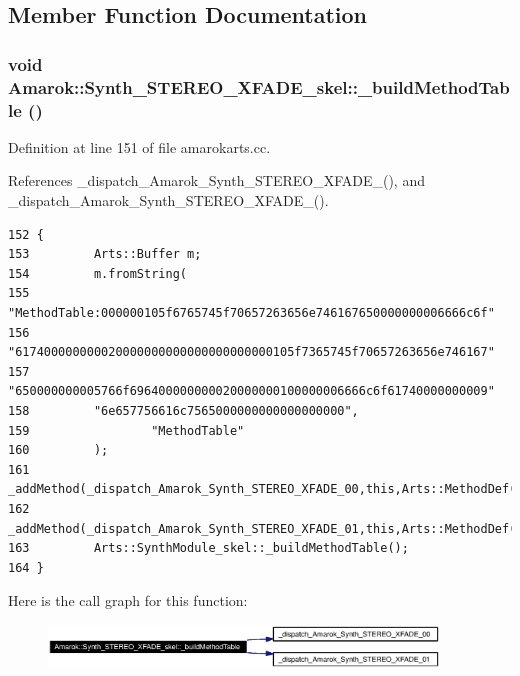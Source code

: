 \subsection{Member Function Documentation}
\subsubsection{\setlength{\rightskip}{0pt plus 5cm}void Amarok::Synth\_\-STEREO\_\-XFADE\_\-skel::\_\-build\-Method\-Table ()}\label{classAmarok_1_1Synth__STEREO__XFADE__skel_Amarok_1_1Synth__STEREO__XFADE__skela3}




Definition at line 151 of file amarokarts.cc.

References \_\-dispatch\_\-Amarok\_\-Synth\_\-STEREO\_\-XFADE\_(), and \_\-dispatch\_\-Amarok\_\-Synth\_\-STEREO\_\-XFADE\_().



\footnotesize\begin{verbatim}152 {
153         Arts::Buffer m;
154         m.fromString(
155         "MethodTable:000000105f6765745f70657263656e746167650000000006666c6f"
156         "617400000000020000000000000000000000105f7365745f70657263656e746167"
157         "650000000005766f696400000000020000000100000006666c6f61740000000009"
158         "6e657756616c7565000000000000000000",
159                 "MethodTable"
160         );
161         _addMethod(_dispatch_Amarok_Synth_STEREO_XFADE_00,this,Arts::MethodDef(m));
162         _addMethod(_dispatch_Amarok_Synth_STEREO_XFADE_01,this,Arts::MethodDef(m));
163         Arts::SynthModule_skel::_buildMethodTable();
164 }
\end{verbatim}\normalsize 


Here is the call graph for this function:\begin{figure}[H]
\begin{center}
\leavevmode
\includegraphics[width=294pt]{classAmarok_1_1Synth__STEREO__XFADE__skel_Amarok_1_1Synth__STEREO__XFADE__skela3_cgraph}
\end{center}
\end{figure}
